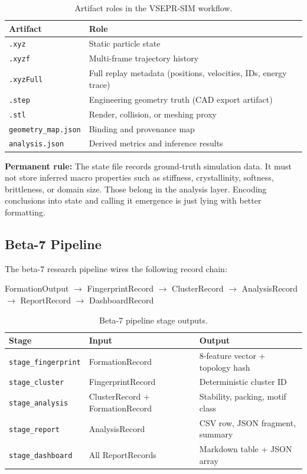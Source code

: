 \documentclass[12pt]{article}
\newcommand{\vsim}{\textsc{VSEPR-SIM}}
\newcommand{\xyz}{\texttt{.xyz}}
\newcommand{\xyzf}{\texttt{.xyzf}}
\newcommand{\xyzfull}{\texttt{.xyzFull}}
\newcommand{\stepfile}{\texttt{.step}}
\newcommand{\stlfile}{\texttt{.stl}}
\newcommand{\sigbox}[1]{%
	\begin{mdframed}[backgroundcolor=gray!8,linecolor=gray!60,linewidth=0.8pt,
					 innertopmargin=6pt,innerbottommargin=6pt,
					 innerleftmargin=10pt,innerrightmargin=10pt]
	\small #1
	\end{mdframed}%
}
\begin{document}
\begin{table}[H]
\centering
\caption{Artifact roles in the \vsim{} workflow.}
\label{tab:artifacts}
\begin{tabular}{ll}
\toprule
\textbf{Artifact} & \textbf{Role} \\
\midrule
\xyz{}                    & Static particle state \\
\xyzf{}                   & Multi-frame trajectory history \\
\xyzfull{}                & Full replay metadata (positions, velocities, IDs, energy trace) \\
\stepfile{}               & Engineering geometry truth (CAD export artifact) \\
\stlfile{}                & Render, collision, or meshing proxy \\
\texttt{geometry\_map.json} & Binding and provenance map \\
\texttt{analysis.json}    & Derived metrics and inference results \\
\bottomrule
\end{tabular}
\end{table}

\sigbox{%
\textbf{Permanent rule:}
The state file records ground-truth simulation data.
It must not store inferred macro properties such as stiffness, crystallinity,
softness, brittleness, or domain size.
Those belong in the analysis layer.
Encoding conclusions into state and calling it emergence is just lying
with better formatting.%
}

\subsection{Beta-7 Pipeline}

The beta-7 research pipeline wires the following record chain:

\begin{center}
FormationOutput
$\to$ FingerprintRecord
$\to$ ClusterRecord
$\to$ AnalysisRecord
$\to$ ReportRecord
$\to$ DashboardRecord
\end{center}

\begin{table}[H]
\centering
\caption{Beta-7 pipeline stage outputs.}
\label{tab:pipeline}
\begin{tabular}{lll}
\toprule
\textbf{Stage} & \textbf{Input} & \textbf{Output} \\
\midrule
\texttt{stage\_fingerprint} & FormationRecord & 8-feature vector + topology hash \\
\texttt{stage\_cluster}     & FingerprintRecord & Deterministic cluster ID \\
\texttt{stage\_analysis}    & ClusterRecord + FormationRecord & Stability, packing, motif class \\
\texttt{stage\_report}      & AnalysisRecord & CSV row, JSON fragment, summary \\
\texttt{stage\_dashboard}   & All ReportRecords & Markdown table + JSON array \\
\bottomrule
\end{tabular}
\end{table}
\end{document}
